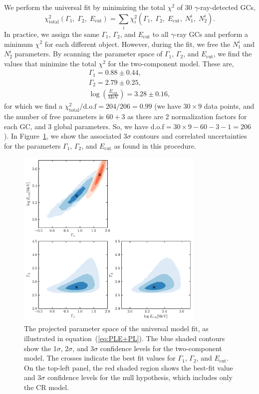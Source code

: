 \documentclass[doublespace,draft,nopageskip]{VTthesis} %
\begin{document}
We perform the universal fit by minimizing the total $\chi^2$ of 30 $\gamma$-ray-detected GCs,
\begin{equation}
    \chi^2_\mathrm{total}(\Gamma_1,\;\Gamma_2,\;E_\mathrm{cut}) = \sum_i\chi_i^2(\Gamma_1,\;\Gamma_2,\;E_\mathrm{cut},\;N_1^i,\;N_2^i).
\end{equation}
In practice, we assign the same $\Gamma_1$, $\Gamma_2$, and $E_\mathrm{cut}$ to all $\gamma$-ray GCs and perform a minimum $\chi^2$ for each different object. However, during the fit, we free the $N_1^i$ and $N_2^i$ parameters. By scanning the parameter space of $\Gamma_1$, $\Gamma_2$, and $E_\mathrm{cut}$, we find the values that minimize the total $\chi^2$ for the two-component model. These are, 
\begin{align}\nonumber
    \Gamma_1 = 0.88 \pm 0.44,\\\nonumber
    \Gamma_2 = 2.79 \pm 0.25,\\\nonumber
    \log\left(\frac{E_\mathrm{cut}}{\mathrm{MeV}}\right) = 3.28 \pm 0.16,
\end{align}
for which we find a $\chi^2_\mathrm{total} / \mathrm{d.o.f} = 204/206 = 0.99$ (we have $30\times 9$ data points, and the number of free parameters is $60+3$ as there are 2 normalization factors for each GC, and 3 global parameters. So, we have $\mathrm{d.o.f}=30\times 9 - 60 - 3 -1 = 206$). In Figure~\ref{fig:global}, we show the associated 3$\sigma$ contours and correlated uncertainties for the parameters $\Gamma_1$, $\Gamma_2$, and $E_\mathrm{cut}$ as found in this procedure.

\begin{figure}
    \includegraphics[width=0.8\textwidth]{Figures/Globular/globalfit.pdf}
    \caption{The projected parameter space of the universal model fit, as illustrated in equation~(\ref{eq:PLE+PL}). The blue shaded contours show the 1$\sigma$, 2$\sigma$, and 3$\sigma$ confidence levels for the two-component model. The crosses indicate the best fit values for $\Gamma_1$, $\Gamma_2$, and $E_\mathrm{cut}$. On the top-left panel, the red shaded region shows the best-fit value and 3$\sigma$ confidence levels for the null hypothesis, which includes only the CR model.}
    \label{fig:global}
\end{figure}
\end{document}
